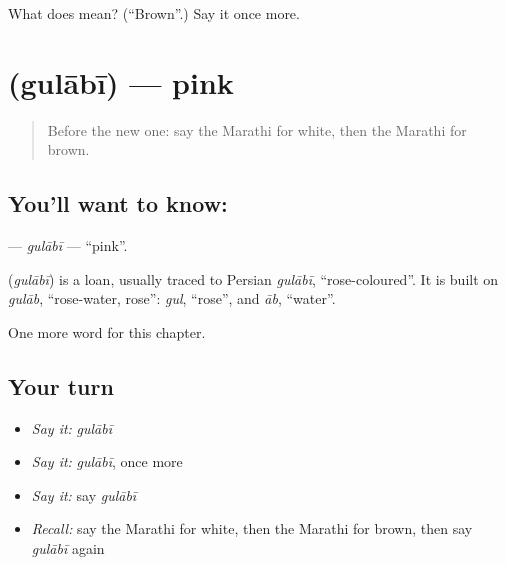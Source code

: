 \begin{tcolorbox}[breakable,colback=teal!4,colframe=teal!35!black,title={Before you move on}]
What does  mean? (\textquotedblleft{}Brown\textquotedblright{}.) Say it once more.
\end{tcolorbox}
\section[\texorpdfstring{\mr{गुलाबी} (gulābī)}{गुलाबी (gulābī)}]{ (gulābī) — pink}

\label{lesson:MR-C108-gulabi}



\begin{quote}
Before the new one: say the Marathi for white, then the Marathi for brown.
\end{quote}

\subsection*{You'll want to know: }
\textbf{} — \emph{gulābī} — \textquotedblleft{}pink\textquotedblright{}.

\begin{cousinweb}
\textbf{} (\emph{gulābī}) is a loan, usually traced to Persian \emph{gulābī}, \textquotedblleft{}rose-coloured\textquotedblright{}. It is built on \emph{gulāb}, \textquotedblleft{}rose-water, rose\textquotedblright{}: \emph{gul}, \textquotedblleft{}rose\textquotedblright{}, and \emph{āb}, \textquotedblleft{}water\textquotedblright{}.
\end{cousinweb}

\begin{grammarlens}[title={What you've built}]
One more word for this chapter.
\end{grammarlens}

\subsection*{Your turn}
\begin{itemize}
\raggedright
  \item \emph{Say it:} \emph{gulābī}
  \item \emph{Say it:} \emph{gulābī}, once more
  \item \emph{Say it:} say \emph{gulābī}
  \item \emph{Recall:} say the Marathi for white, then the Marathi for brown, then say \emph{gulābī} again
\end{itemize}

